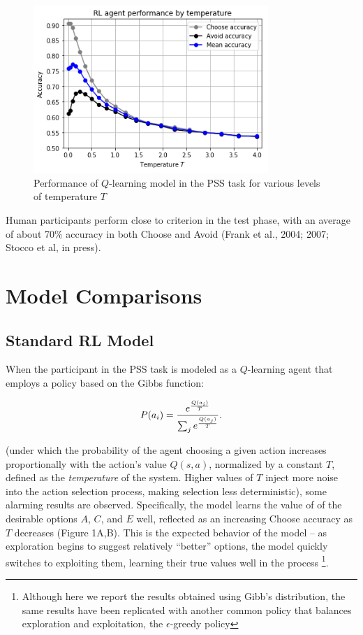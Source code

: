 \documentclass[10pt,letterpaper]{article}
\begin{document}
\begin{figure}[ht]
	\begin{center}
		\includegraphics[width=3.5in]{rl-performance.png}
	\end{center}
	\caption{Performance of $Q$-learning model in the PSS task for various levels of temperature $T$} 
	\label{RL-agent-performance}
\end{figure}

Human participants perform close to criterion in the test phase, with an average of about 70\% accuracy in both Choose and Avoid (Frank et al., 2004; 2007; Stocco et al, in press).

\section{Model Comparisons}

\subsection{Standard RL Model}

When the participant in the PSS task is modeled as a $Q$-learning agent that employs a policy based on the Gibbs function:

\begin{equation}
P(a_i) = \frac{e^{\frac{Q(a_i)}{T}}}{\sum_{j} e^{\frac{Q(a_j)}{T}}}\\.
\end{equation}

(under which the probability of the agent choosing a given action increases proportionally with the action's value $Q(s,a)$, normalized by a constant $T$, defined as the \emph{temperature} of the system. Higher values of $T$ inject more noise into the action selection process, making selection less deterministic), some alarming results are observed. Specifically, the model learns the value of of the desirable options $A$, $C$, and $E$ well, reflected as an increasing Choose accuracy as $T$ decreases (Figure 1A,B). This is the expected behavior of the model -- as exploration begins to suggest relatively ``better'' options, the model quickly switches to exploiting them, learning their true values well in the process \footnote{Although here we report the results obtained using Gibb's distribution, the same results have been replicated with another common policy that balances exploration and exploitation, the $\epsilon$-greedy policy}. 
\end{document}

